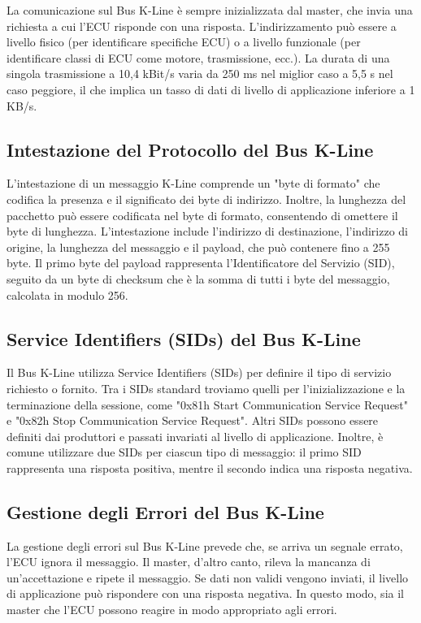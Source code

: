 La comunicazione sul Bus K-Line è sempre inizializzata dal master, che invia una richiesta a cui l'ECU risponde con una risposta. L'indirizzamento può essere a livello fisico (per identificare specifiche ECU) o a livello funzionale (per identificare classi di ECU come motore, trasmissione, ecc.). La durata di una singola trasmissione a 10,4 kBit/s varia da 250 ms nel miglior caso a 5,5 s nel caso peggiore, il che implica un tasso di dati di livello di applicazione inferiore a 1 KB/s.

\subsection{Intestazione del Protocollo del Bus K-Line}

L'intestazione di un messaggio K-Line comprende un "byte di formato" che codifica la presenza e il significato dei byte di indirizzo. Inoltre, la lunghezza del pacchetto può essere codificata nel byte di formato, consentendo di omettere il byte di lunghezza. L'intestazione include l'indirizzo di destinazione, l'indirizzo di origine, la lunghezza del messaggio e il payload, che può contenere fino a 255 byte. Il primo byte del payload rappresenta l'Identificatore del Servizio (SID), seguito da un byte di checksum che è la somma di tutti i byte del messaggio, calcolata in modulo 256.

\subsection{Service Identifiers (SIDs) del Bus K-Line}

Il Bus K-Line utilizza Service Identifiers (SIDs) per definire il tipo di servizio richiesto o fornito. Tra i SIDs standard troviamo quelli per l'inizializzazione e la terminazione della sessione, come "0x81h Start Communication Service Request" e "0x82h Stop Communication Service Request". Altri SIDs possono essere definiti dai produttori e passati invariati al livello di applicazione. Inoltre, è comune utilizzare due SIDs per ciascun tipo di messaggio: il primo SID rappresenta una risposta positiva, mentre il secondo indica una risposta negativa.

\subsection{Gestione degli Errori del Bus K-Line}

La gestione degli errori sul Bus K-Line prevede che, se arriva un segnale errato, l'ECU ignora il messaggio. Il master, d'altro canto, rileva la mancanza di un'accettazione e ripete il messaggio. Se dati non validi vengono inviati, il livello di applicazione può rispondere con una risposta negativa. In questo modo, sia il master che l'ECU possono reagire in modo appropriato agli errori.

